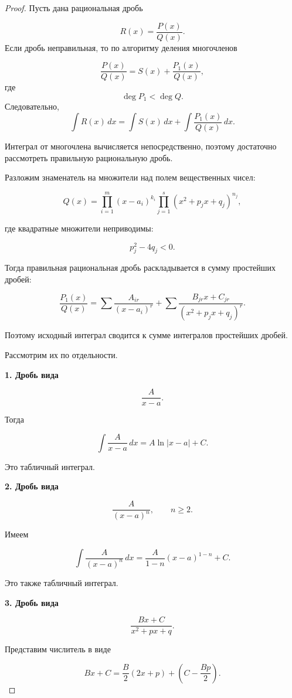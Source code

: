 \documentclass[14pt]{extreport}
\begin{document}
\begin{proof}

Пусть дана рациональная дробь

\[
R(x)=\frac{P(x)}{Q(x)}.
\]
Если дробь неправильная, то по алгоритму деления многочленов

\[
\frac{P(x)}{Q(x)}
=
S(x)
+
\frac{P_1(x)}{Q(x)},
\]
где
\[
\deg P_1 < \deg Q.
\]
Следовательно,
\[
\int R(x)\,dx
=
\int S(x)\,dx
+
\int \frac{P_1(x)}{Q(x)}\,dx.
\]

Интеграл от многочлена вычисляется непосредственно,
поэтому достаточно рассмотреть правильную рациональную дробь.

Разложим знаменатель на множители над полем вещественных чисел:

\[
Q(x)
=
\prod_{i=1}^{m}(x-a_i)^{k_i}
\prod_{j=1}^{s}
(x^2+p_jx+q_j)^{n_j},
\]

где квадратные множители неприводимы:

\[
p_j^2-4q_j<0.
\]

Тогда правильная рациональная дробь раскладывается в сумму простейших дробей:

\[
\frac{P_1(x)}{Q(x)}
=
\sum
\frac{A_{ir}}{(x-a_i)^r}
+
\sum
\frac{B_{jr}x+C_{jr}}
     {(x^2+p_jx+q_j)^r}.
\]

Поэтому исходный интеграл сводится к сумме интегралов простейших дробей.

Рассмотрим их по отдельности.

\medskip

\textbf{1. Дробь вида}

\[
\frac{A}{x-a}.
\]

Тогда

\[
\int\frac{A}{x-a}\,dx
=
A\ln|x-a|+C.
\]

Это табличный интеграл.

\medskip

\textbf{2. Дробь вида}

\[
\frac{A}{(x-a)^n},
\qquad n\ge2.
\]

Имеем

\[
\int\frac{A}{(x-a)^n}\,dx
=
\frac{A}{1-n}(x-a)^{1-n}+C.
\]

Это также табличный интеграл.

\medskip

\textbf{3. Дробь вида}

\[
\frac{Bx+C}{x^2+px+q}.
\]

Представим числитель в виде

\[
Bx+C
=
\frac{B}{2}(2x+p)
+
\left(C-\frac{Bp}{2}\right).
\]


\end{proof}
\end{document}
